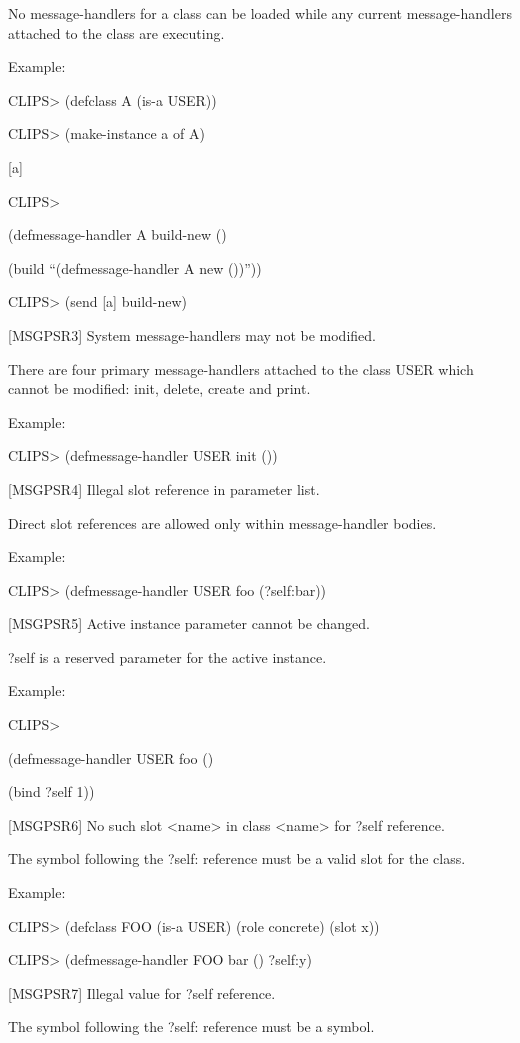 \documentclass[letterpaper,10pt,english]{sphinxmanual}
\begin{document}
No message-handlers for a class can be loaded while any current
message-handlers attached to the class are executing.

Example:

CLIPS\textgreater{} (defclass A (is-a USER))

CLIPS\textgreater{} (make-instance a of A)

{[}a{]}

CLIPS\textgreater{}

(defmessage-handler A build-new ()

(build “(defmessage-handler A new ())”))

CLIPS\textgreater{} (send {[}a{]} build-new)

{[}MSGPSR3{]} System message-handlers may not be modified.

There are four primary message-handlers attached to the class USER which
cannot be modified: init, delete, create and print.

Example:

CLIPS\textgreater{} (defmessage-handler USER init ())

{[}MSGPSR4{]} Illegal slot reference in parameter list.

Direct slot references are allowed only within message-handler bodies.

Example:

CLIPS\textgreater{} (defmessage-handler USER foo (?self:bar))

{[}MSGPSR5{]} Active instance parameter cannot be changed.

?self is a reserved parameter for the active instance.

Example:

CLIPS\textgreater{}

(defmessage-handler USER foo ()

(bind ?self 1))

{[}MSGPSR6{]} No such slot \textless{}name\textgreater{} in class \textless{}name\textgreater{} for ?self reference.

The symbol following the ?self: reference must be a valid slot for the
class.

Example:

CLIPS\textgreater{} (defclass FOO (is-a USER) (role concrete) (slot x))

CLIPS\textgreater{} (defmessage-handler FOO bar () ?self:y)

{[}MSGPSR7{]} Illegal value for ?self reference.

The symbol following the ?self: reference must be a symbol.
\end{document}

